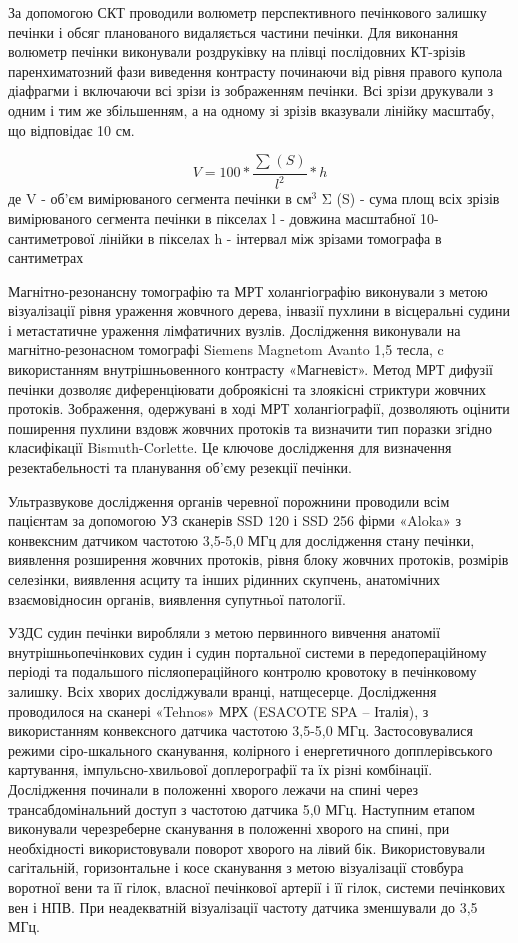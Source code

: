 За допомогою СКТ проводили волюметр перспективного печінкового залишку печінки і обсяг планованого видаляється частини печінки. Для виконання волюметр печінки виконували роздруківку на плівці послідовних КТ-зрізів паренхиматозний фази виведення контрасту починаючи від рівня правого купола діафрагми і включаючи всі зрізи із зображенням печінки. Всі зрізи друкували з одним і тим же збільшенням, а на одному зі зрізів вказували лінійку масштабу, що відповідає 10 см.

\[ V = 100 * \frac{\sum_{} (S)}{l^2}*h \]
де 
V - об'єм вимірюваного сегмента печінки в см$^3$
Σ (S) - сума площ всіх зрізів вимірюваного сегмента печінки в пікселах
l - довжина масштабної 10-сантиметрової лінійки в пікселах
h - інтервал між зрізами томографа в сантиметрах

Магнітно-резонансну томографію та МРТ холангіографію виконували з метою візуалізації рівня ураження жовчного дерева, інвазії пухлини в вісцеральні судини і метастатичне ураження лімфатичних вузлів.  Дослідження виконували на магнітно-резонасном томографі Siemens Magnetom Avanto 1,5 тесла, c використанням внутрішньовенного контрасту «Магневіст». Метод МРТ дифузії печінки дозволяє диференціювати доброякісні та злоякісні стриктури жовчних протоків. Зображення, одержувані в ході МРТ холангіографії, дозволяють оцінити поширення пухлини вздовж жовчних протоків та визначити тип поразки згідно класифікації Bismuth-Corlette. Це ключове дослідження для визначення резектабельності та планування об'єму резекції печінки.

Ультразвукове дослідження органів черевної порожнини проводили всім пацієнтам за допомогою УЗ сканерів SSD 120 і SSD 256 фірми «Aloka» з конвексним датчиком частотою 3,5-5,0 МГц для дослідження стану печінки, виявлення розширення жовчних протоків, рівня блоку жовчних протоків, розмірів селезінки, виявлення асциту та інших рідинних скупчень, анатомічних взаємовідносин органів, виявлення супутньої патології.

УЗДС судин печінки виробляли з метою первинного вивчення анатомії внутрішньопечінкових судин і судин портальної системи в передопераційному періоді та подальшого післяопераційного контролю кровотоку в печінковому залишку. Всіх хворих досліджували вранці, натщесерце. Дослідження проводилося на сканері «Tehnos» МРХ (ESACOTE SPA – Італія), з використанням конвексного датчика частотою 3,5-5,0 МГц. Застосовувалися режими сіро-шкального сканування, колірного і енергетичного допплерівського картування, імпульсно-хвильової доплерографії та їх різні комбінації. Дослідження починали в положенні хворого лежачи на спині через трансабдомінальний доступ з частотою датчика 5,0 МГц. Наступним етапом виконували черезреберне сканування в положенні хворого на спині, при необхідності використовували поворот хворого на лівий бік. Використовували сагітальній, горизонтальне і косе сканування з метою візуалізації стовбура воротної вени та її гілок, власної печінкової артерії і її гілок, системи печінкових вен і НПВ. При неадекватній візуалізації частоту датчика зменшували до 3,5 МГц.

